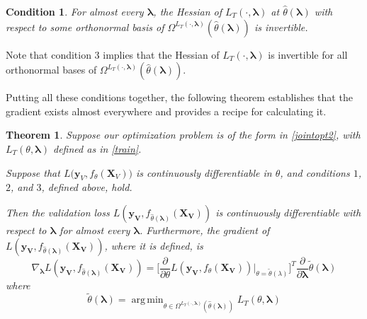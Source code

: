 \documentclass[10pt,letterpaper]{article}
\newtheorem{theorem}{Theorem}
\newtheorem{condition}{Condition}
\DeclareMathOperator*{\argmin}{arg\,min}
\begin{document}
\begin{condition}
For almost every $\boldsymbol{\lambda}$, the Hessian of $L_T\left(\cdot, \boldsymbol{\lambda}\right)$ at $\hat{\theta}\left(\boldsymbol{\lambda}\right)$ with respect to some orthonormal basis of $\Omega^{L_T(\cdot, \boldsymbol{\lambda})}(\hat{\theta}\left(\boldsymbol{\lambda}\right))$ is invertible.

\end{condition}
Note that condition 3 implies that the Hessian of $L_T \left(\cdot, \boldsymbol{\lambda}\right)$ is invertible for all orthonormal bases of $\Omega^{L_T(\cdot, \boldsymbol{\lambda})}(\hat{\theta}\left(\boldsymbol{\lambda}\right))$.

Putting all these conditions together, the following theorem establishes that the gradient exists almost everywhere and provides a recipe for calculating it.

\begin{theorem}
Suppose our optimization problem is of the form in \eqref{jointopt2}, with $L_T\left(\theta, \boldsymbol{\lambda}\right)$ defined as in \eqref{train}.

Suppose that $L \Big( \boldsymbol{y}_V, f_{\theta}(\boldsymbol{X}_V)\Big)$ is continuously differentiable in $\theta$, and conditions $1$, $2$, and $3$, defined above, hold.

Then the validation loss $L(\boldsymbol{y_V}, f_{\hat \theta(\boldsymbol{\lambda})}(\boldsymbol{X_V}))$ is continuously differentiable with respect to $\boldsymbol{\lambda}$ for almost every $\boldsymbol{\lambda}$. Furthermore, the gradient of $L(\boldsymbol{y_V}, f_{\hat \theta(\boldsymbol{\lambda})}(\boldsymbol{X_V}))$, where it is defined, is
\begin{equation}
\nabla_{\boldsymbol{\lambda}} L(\boldsymbol{y_V}, f_{\hat \theta(\boldsymbol{\lambda})}(\boldsymbol{X_V})) = \Big [ \frac{\partial}{\partial \theta} L(\boldsymbol{y_V}, f_{\theta}(\boldsymbol{X_V})) |_{\theta=\tilde\theta(\lambda)} \Big ]^T \frac{\partial}{\partial \boldsymbol{\lambda}} \tilde{\theta}(\boldsymbol{\lambda})
\end{equation}
where
\begin{equation}
\tilde{\theta}(\boldsymbol{\lambda}) = \argmin_{\theta \in \Omega^{L_T(\cdot, \boldsymbol{\lambda})}(\hat \theta(\boldsymbol{\lambda}))} L_T(\theta , \boldsymbol{\lambda})
\label{restrictedmodelparams}
\end{equation}
\label{thethrm}
\end{theorem}
\end{document}

